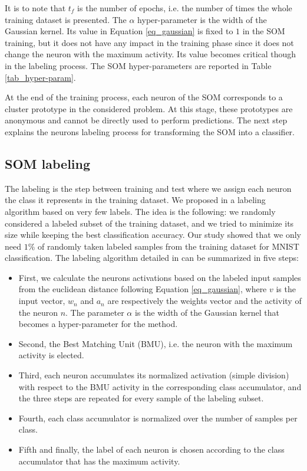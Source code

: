 \documentclass[runningheads]{llncs}
\begin{document}
It is to note that $t_f$ is the number of epochs, i.e. the number of times the whole training dataset is presented.
The $\alpha$ hyper-parameter is the width of the Gaussian kernel. Its value in Equation \ref{eq_gaussian} is fixed to $1$ in the SOM training, but it does not have any impact in the training phase since it does not change the neuron with the maximum activity. Its value becomes critical though in the labeling process.
The SOM hyper-parameters are reported in Table \ref{tab_hyper-param}.

At the end of the training process, each neuron of the SOM corresponds to a cluster prototype in the considered problem. At this stage, these prototypes are anonymous and cannot be directly used to perform predictions. The next step explains the neurons labeling process for transforming the SOM into a classifier.

\subsection{SOM labeling}
\label{sec_som-labeling}
The labeling is the step between training and test where we assign each neuron the class it represents in the training dataset. We proposed in \cite{khacef2019self-organizing_neurons} a labeling algorithm based on very few labels. The idea is the following: we randomly considered a labeled subset of the training dataset, and we tried to minimize its size while keeping the best classification accuracy. Our study showed that we only need $1 \%$ of randomly taken labeled samples from the training dataset for MNIST classification.
The labeling algorithm detailed in \cite{khacef2019self-organizing_neurons} can be summarized in five steps:

\begin{itemize}
    \item First, we calculate the neurons activations based on the labeled input samples from the euclidean distance following Equation \ref{eq_gaussian}, where $v$ is the input vector, $w_n$ and $a_n$ are respectively the weights vector and the activity of the neuron $n$. The parameter $\alpha$ is the width of the Gaussian kernel that becomes a hyper-parameter for the method.
    
    \item Second, the Best Matching Unit (BMU), i.e. the neuron with the maximum activity is elected.
    
    \item Third, each neuron accumulates its normalized activation (simple division) with respect to the BMU activity in the corresponding class accumulator, and the three steps are repeated for every sample of the labeling subset.

    \item Fourth, each class accumulator is normalized over the number of samples per class.

    \item Fifth and finally, the label of each neuron is chosen according to the class accumulator that has the maximum activity.
\end{itemize}
\end{document}
